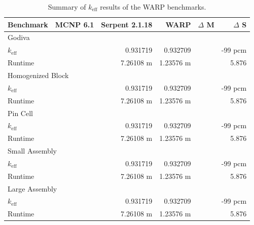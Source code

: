 \begin{table}[h]
\centering
\caption{Summary of $k_\mathrm{eff}$ results of the WARP benchmarks.}
\label{benchmark_summary}
\begin{tabular}{| l | r | r | r | r | r |}
 \hline
 Benchmark & MCNP 6.1 & Serpent 2.1.18 & WARP & $\Delta$ M & $\Delta$ S  \\
\hline
\hline
\multicolumn{6}{|l|}{Godiva}  \\
\hline
 $k_\mathrm{eff}$ & & 0.931719 & 0.932709 & & -99 pcm  \\
 \hline
 Runtime               & & 7.26108 m & 1.23576 m  & & 5.876 \\
 \hline
 \hline
\multicolumn{6}{|l|}{Homogenized Block }\\
\hline
 $k_\mathrm{eff}$ & & 0.931719 & 0.932709 & & -99 pcm   \\
 \hline
 Runtime               & & 7.26108 m & 1.23576 m & & 5.876 \\
 \hline
  \hline
\multicolumn{6}{|l|}{Pin Cell}\\
\hline
 $k_\mathrm{eff}$ & & 0.931719 & 0.932709 & & -99 pcm    \\
 \hline
 Runtime               & & 7.26108 m & 1.23576 m & & 5.876  \\
 \hline
  \hline
\multicolumn{6}{|l|}{Small Assembly}\\
\hline
 $k_\mathrm{eff}$ & & 0.931719 & 0.932709 & & -99 pcm  \\
 \hline
 Runtime               & & 7.26108 m & 1.23576 m  & & 5.876 \\
 \hline
  \hline
\multicolumn{6}{|l|}{Large Assembly}\\
\hline
 $k_\mathrm{eff}$ & & 0.931719 & 0.932709 & & -99 pcm   \\
 \hline
 Runtime               & & 7.26108 m & 1.23576 m & & 5.876  \\
 \hline
\end{tabular}
\end{table}


